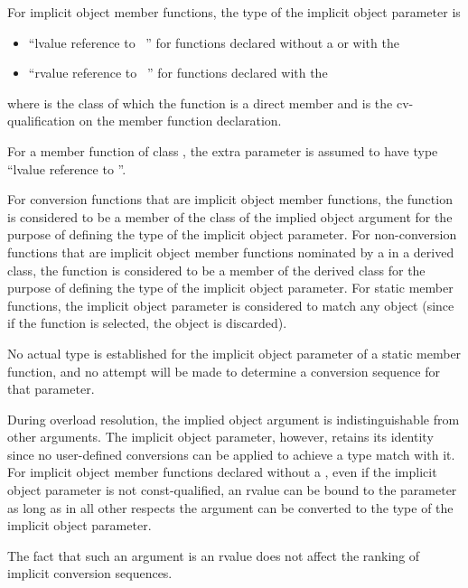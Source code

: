 \pnum
For implicit object member functions, the type of the implicit object
parameter is
\begin{itemize}
\item ``lvalue reference to \cv{}~'' for functions declared
without a  or with the
\tcode{\&} 
\item ``rvalue reference to \cv{}~'' for functions declared with the
\tcode{\&\&} 
\end{itemize}
where
is the class of which the function is a direct member and
\cv{}
is the cv-qualification on the
member function declaration.
\begin{example}
For a
member
function of class
,
the extra parameter is assumed to have type
``lvalue reference to
''.
\end{example}
For conversion functions that are implicit object member functions,
the function is considered to be a member of the
class of the implied object argument for the purpose of defining the
type of the implicit object parameter.
For non-conversion functions that are implicit object member functions
nominated by a 
in a derived class, the function is
considered to be a member of the derived class for the purpose of defining
the type of the implicit object parameter.
For static member functions, the implicit object parameter is considered
to match any object (since if the function is selected, the object is
discarded).
\begin{note}
No actual type is established for the implicit object parameter
of a static member function, and no attempt will be made to determine a
conversion sequence for that parameter.
\end{note}

\pnum
{}%
During overload resolution, the implied object argument is
indistinguishable from other arguments.
The implicit object
parameter, however, retains its identity since
no user-defined conversions can be applied to achieve a type
match with it.
%
For implicit object member functions declared without a ,
even if the implicit object parameter is not const-qualified,
an rvalue can be bound to the parameter
as long as in all other respects the argument can be
converted to the type of the implicit object parameter.
\begin{note}
The fact that such an argument is an rvalue does not
affect the ranking of implicit conversion sequences.
\end{note}


